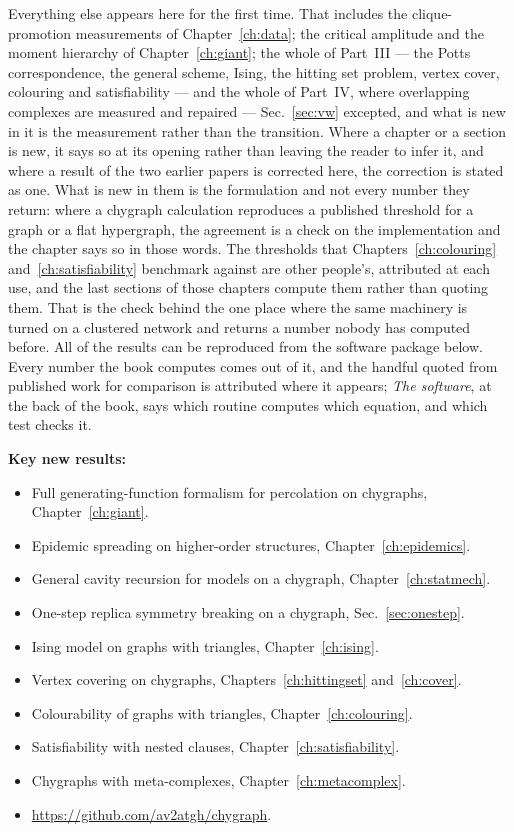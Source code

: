 Everything else appears here for the first time. That includes the
clique-promotion measurements of Chapter~\ref{ch:data}; the critical
amplitude and the moment hierarchy of Chapter~\ref{ch:giant}; the whole of
Part~III --- the Potts correspondence, the general scheme, Ising, the hitting
set problem, vertex cover, colouring and satisfiability --- and the whole of
Part~IV, where overlapping complexes are measured and repaired ---
Sec.~\ref{sec:vw} excepted, and what is new in it is the measurement rather
than the transition. Where a chapter or a section
is new, it says so at its opening rather than leaving the reader to infer it,
and where a result of the two earlier papers is corrected here, the correction
is stated as one.
What is new in them is the formulation and not every number they return: where a chygraph calculation reproduces a published
threshold for a graph or a flat hypergraph, the agreement is a check on the
implementation and the chapter says so in those words. The thresholds that
Chapters~\ref{ch:colouring} and~\ref{ch:satisfiability} benchmark against are
other people's, attributed at each use, and the last sections of those chapters
compute them rather than quoting them. That is the check behind the one place
where the same machinery is turned on a clustered network and returns a number
nobody has computed before. All of the results can be reproduced from the
software package below. Every number the book computes comes out of it,
and the handful quoted from published work for comparison is attributed where it
appears; \emph{The software}, at the back of the book, says which routine
computes which equation, and which test checks it.

\medskip
\noindent\textbf{Key new results:}

\begin{itemize}\setlength{\itemsep}{2pt}
\item Full generating-function formalism for percolation on chygraphs,
  Chapter~\ref{ch:giant}.
\item Epidemic spreading on higher-order structures,
  Chapter~\ref{ch:epidemics}.
\item General cavity recursion for models on a chygraph,
  Chapter~\ref{ch:statmech}.
\item One-step replica symmetry breaking on a chygraph,
  Sec.~\ref{sec:onestep}.
\item Ising model on graphs with triangles, Chapter~\ref{ch:ising}.
\item Vertex covering on chygraphs, Chapters~\ref{ch:hittingset}
  and~\ref{ch:cover}.
\item Colourability of graphs with triangles, Chapter~\ref{ch:colouring}.
\item Satisfiability with nested clauses, Chapter~\ref{ch:satisfiability}.
\item Chygraphs with meta-complexes, Chapter~\ref{ch:metacomplex}.
\item \url{https://github.com/av2atgh/chygraph}.
\end{itemize}

